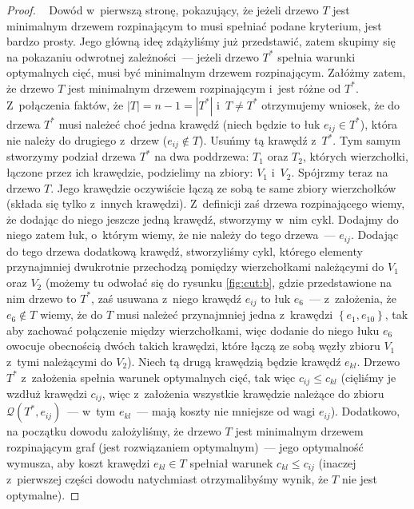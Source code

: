 \begin{proof}~\cite[$518$]{Ahuja:1993:NFT:137406}
	Dowód w~pierwszą stronę, pokazujący, że jeżeli drzewo $T$ jest minimalnym drzewem rozpinającym to musi spełniać podane kryterium, jest bardzo prosty.
	Jego główną ideę zdążyliśmy już przedstawić, zatem skupimy się na pokazaniu odwrotnej zależności~--- jeżeli drzewo $T^{\ast}$ spełnia warunki optymalnych cięć, musi być minimalnym drzewem rozpinającym.
	Załóżmy zatem, że drzewo $T$ jest minimalnym drzewem rozpinającym i~jest różne od $T^{\ast}$.
	Z~połączenia faktów, że $\left| T \right| = n - 1 = \left| T^{\ast} \right|$ i~$T \neq T^{\ast}$ otrzymujemy wniosek, że do drzewa $T^{\ast}$ musi należeć choć jedna krawędź (niech będzie to łuk $e_{ij} \in T^{\ast}$), która nie należy do drugiego z~drzew ($e_{ij} \notin T$).
	Usuńmy tą krawędź z~$T^{\ast}$.
	Tym samym stworzymy podział drzewa $T^{\ast}$ na dwa poddrzewa: $T_{1}$ oraz $T_{2}$, których wierzchołki, łączone przez ich krawędzie, podzielimy na zbiory: $V_{1}$ i~$V_{2}$.
	Spójrzmy teraz na drzewo $T$.
	Jego krawędzie oczywiście łączą ze sobą te same zbiory wierzchołków (składa się tylko z~innych krawędzi).
	Z~definicji zaś drzewa rozpinającego wiemy, że dodając do niego jeszcze jedną krawędź, stworzymy w~nim cykl.
	Dodajmy do niego zatem łuk, o~którym wiemy, że nie należy do tego drzewa~--- $e_{ij}$.
	Dodając do tego drzewa dodatkową krawędź, stworzyliśmy cykl, którego elementy przynajmniej dwukrotnie przechodzą pomiędzy wierzchołkami należącymi do $V_{1}$ oraz $V_{2}$ (możemy tu odwołać się do rysunku \ref{fig:cut:b}, gdzie przedstawione na nim drzewo to $T^{\ast}$, zaś usuwana z~niego krawędź $e_{ij}$ to łuk $e_{6}$~--- z~założenia, że $e_{6} \notin T$ wiemy, że do $T$ musi należeć przynajmniej jedna z~krawędzi $\left\{ e_{1}, e_{10} \right\}$, tak aby zachować połączenie między wierzchołkami, więc dodanie do niego łuku $e_{6}$ owocuje obecnością dwóch takich krawędzi, które łączą ze sobą węzły zbioru $V_{1}$ z~tymi należącymi do $V_{2}$).
	Niech tą drugą krawędzią będzie krawędź $e_{kl}$.
	Drzewo $T^{\ast}$ z~założenia spełnia warunek optymalnych cięć, tak więc $c_{ij} \leqslant c_{kl}$ (cięliśmy je wzdłuż krawędzi $c_{ij}$, więc z~założenia wszystkie krawędzie należące do zbioru $\mathcal{Q} \left( T^{\ast}, e_{ij} \right)$~--- w~tym $e_{kl}$~--- mają koszty nie mniejsze od wagi $e_{ij}$).
	Dodatkowo, na początku dowodu założyliśmy, że drzewo $T$ jest minimalnym drzewem rozpinającym graf (jest rozwiązaniem optymalnym)~--- jego optymalność wymusza, aby koszt krawędzi $e_{kl} \in T$ spełniał warunek $c_{kl} \leqslant c_{ij}$ (inaczej z~pierwszej części dowodu natychmiast otrzymalibyśmy wynik, że $T$ nie jest optymalne).

\end{proof}
